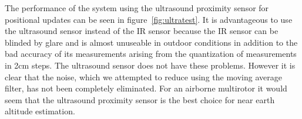 The performance of the system using the ultrasound proximity sensor for positional updates can be seen in figure~\ref{fig:ultratest}.
It is advantageous to use the ultrasound sensor instead of the IR sensor because the IR sensor can be blinded by glare and is almost
unuseable in outdoor conditions in addition to the bad accuracy of its measurements arising from the quantization of measurements in
2cm steps. The ultrasound sensor does not have these problems. However it is clear that the noise, which we attempted to reduce using the
moving average filter, has not been completely eliminated. For an airborne multirotor it would seem that the ultrasound proximity 
sensor is the best choice for near earth altitude estimation.
	
